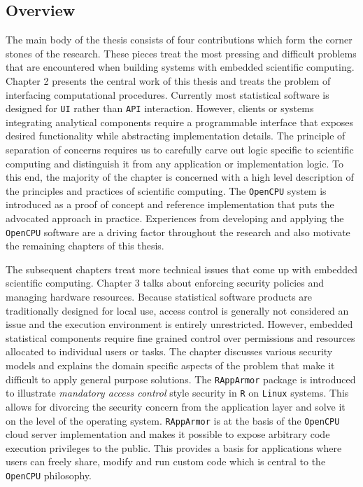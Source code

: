 \subsection{Overview}

The main body of the thesis consists of four contributions which form the corner stones of the research. These pieces treat the most pressing and difficult problems that are encountered when building systems with embedded scientific computing. Chapter 2 presents the central work of this thesis and treats the problem of interfacing computational procedures. Currently most statistical software is designed for \texttt{UI} rather than \texttt{API} interaction. However, clients or systems integrating analytical components require a programmable interface that exposes desired functionality while abstracting implementation details. The principle of separation of concerns requires us to carefully carve out logic specific to scientific computing and distinguish it from any application or implementation logic. To this end, the majority of the chapter is concerned with a high level description of the principles and practices of scientific computing. The \texttt{OpenCPU} system is introduced as a proof of concept and reference implementation that puts the advocated approach in practice. Experiences from developing and applying the \texttt{OpenCPU} software are a driving factor throughout the research and also motivate the remaining chapters of this thesis. 

The subsequent chapters treat more technical issues that come up with embedded scientific computing. Chapter 3 talks about enforcing security policies and managing hardware resources. Because statistical software products are traditionally designed for local use, access control is generally not considered an issue and the execution environment is entirely unrestricted. However, embedded statistical components require fine grained control over permissions and resources allocated to individual users or tasks. The chapter discusses various security models and explains the domain specific aspects of the problem that make it difficult to apply general purpose solutions. The \texttt{RAppArmor} package is introduced to illustrate \emph{mandatory access control} style security in \texttt{R} on \texttt{Linux} systems. This allows for divorcing the security concern from the application layer and solve it on the level of the operating system. \texttt{RAppArmor} is at the basis of the \texttt{OpenCPU} cloud server implementation and makes it possible to expose arbitrary code execution privileges to the public. This provides a basis for applications where users can freely share, modify and run custom code which is central to the \texttt{OpenCPU} philosophy.

